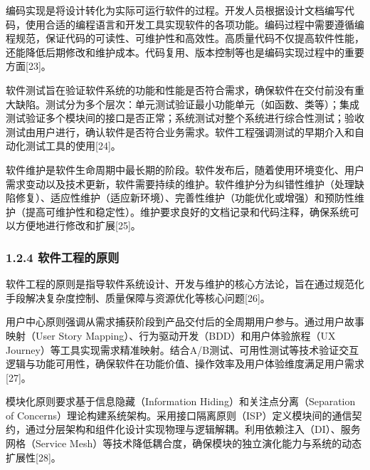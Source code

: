
编码实现是将设计转化为实际可运行软件的过程。开发人员根据设计文档编写代码，使用合适的编程语言和开发工具实现软件的各项功能。编码过程中需要遵循编程规范，保证代码的可读性、可维护性和高效性。高质量代码不仅提高软件性能，还能降低后期修改和维护成本。代码复用、版本控制等也是编码实现过程中的重要方面{[}23{]}。


软件测试旨在验证软件系统的功能和性能是否符合需求，确保软件在交付前没有重大缺陷。测试分为多个层次：单元测试验证最小功能单元（如函数、类等）；集成测试验证多个模块间的接口是否正常；系统测试对整个系统进行综合性测试；验收测试由用户进行，确认软件是否符合业务需求。软件工程强调测试的早期介入和自动化测试工具的使用{[}24{]}。


软件维护是软件生命周期中最长期的阶段。软件发布后，随着使用环境变化、用户需求变动以及技术更新，软件需要持续的维护。软件维护分为纠错性维护（处理缺陷修复）、适应性维护（适应新环境）、完善性维护（功能优化或增强）和预防性维护（提高可维护性和稳定性）。维护要求良好的文档记录和代码注释，确保系统可以方便地进行修改和扩展{[}25{]}。

\hypertarget{ux8f6fux4ef6ux5de5ux7a0bux7684ux539fux5219}{%
\subsubsection{1.2.4 软件工程的原则}\label{ux8f6fux4ef6ux5de5ux7a0bux7684ux539fux5219}}

软件工程的原则是指导软件系统设计、开发与维护的核心方法论，旨在通过规范化手段解决复杂度控制、质量保障与资源优化等核心问题{[}26{]}。


用户中心原则强调从需求捕获阶段到产品交付后的全周期用户参与。通过用户故事映射（User Story Mapping）、行为驱动开发（BDD）和用户体验旅程（UX Journey）等工具实现需求精准映射。结合A/B测试、可用性测试等技术验证交互逻辑与功能可用性，确保软件在功能价值、操作效率及用户体验维度满足用户需求{[}27{]}。


模块化原则要求基于信息隐藏（Information Hiding）和关注点分离（Separation of Concerns）理论构建系统架构。采用接口隔离原则（ISP）定义模块间的通信契约，通过分层架构和组件化设计实现物理与逻辑解耦。利用依赖注入（DI）、服务网格（Service Mesh）等技术降低耦合度，确保模块的独立演化能力与系统的动态扩展性{[}28{]}。


